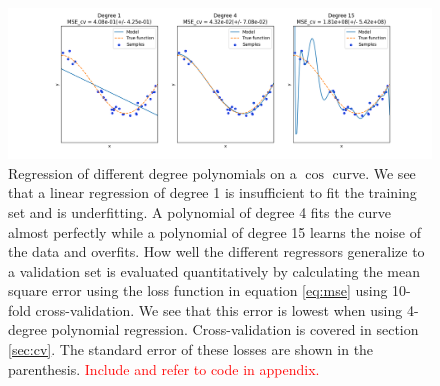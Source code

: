 \begin{figure}
    \centering
    \includegraphics[width=\textwidth,height=\textheight,keepaspectratio]{reg_example.png}
    \caption{Regression of different degree polynomials on a $\cos$ curve. We see that a linear regression of degree 1 is insufficient to fit the training set and is underfitting. A polynomial of degree 4 fits the curve almost perfectly while a polynomial of degree 15 learns the noise of the data and overfits. How well the different regressors generalize to a validation set is evaluated quantitatively by calculating the mean square error using the loss function in equation \ref{eq:mse} using 10-fold cross-validation. We see that this error is lowest when using 4-degree polynomial regression. Cross-validation is covered in section \ref{sec:cv}. The standard error of these losses are shown in the parenthesis. \textcolor{red}{Include and refer to code in appendix.}}
    \label{fig:regr_example}
\end{figure}
\noindent

